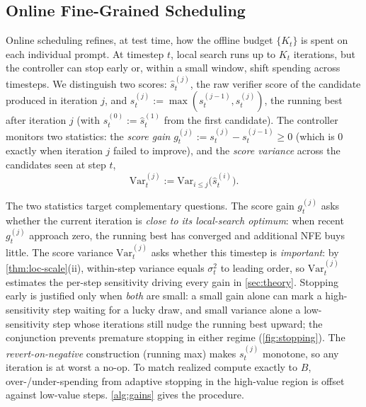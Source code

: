 \subsection{Online Fine-Grained Scheduling}
\label{sec:online}

Online scheduling refines, at test time, how the offline budget $\{K_t\}$ is spent on each individual prompt. At timestep $t$, local search runs up to $K_t$ iterations, but the controller can stop early or, within a small window, shift spending across timesteps. We distinguish two scores: $\hat s_t^{(j)}$, the raw verifier score of the candidate produced in iteration $j$, and $s_t^{(j)} := \max(s_t^{(j-1)}, \hat s_t^{(j)})$, the running best after iteration $j$ (with $s_t^{(0)} := \hat s_t^{(1)}$ from the first candidate). The controller monitors two statistics: the \emph{score gain} $g_t^{(j)} := s_t^{(j)} - s_t^{(j-1)} \ge 0$ (which is $0$ exactly when iteration $j$ failed to improve), and the \emph{score variance} across the candidates seen at step $t$,
\begin{equation}
  \mathrm{Var}_t^{(j)} := \mathrm{Var}_{i \le j}\bigl(\hat s_t^{(i)}\bigr).
\end{equation}

The two statistics target complementary questions. The score gain $g_t^{(j)}$ asks whether the current iteration is \emph{close to its local-search optimum}: when recent $g_t^{(j)}$ approach zero, the running best has converged and additional NFE buys little. The score variance $\mathrm{Var}_t^{(j)}$ asks whether this timestep is \emph{important}: by \cref{thm:loc-scale}(ii), within-step variance equals $\sigma_t^2$ to leading order, so $\mathrm{Var}_t^{(j)}$ estimates the per-step sensitivity driving every gain in \cref{sec:theory}. Stopping early is justified only when \emph{both} are small: a small gain alone can mark a high-sensitivity step waiting for a lucky draw, and small variance alone a low-sensitivity step whose iterations still nudge the running best upward; the conjunction prevents premature stopping in either regime (\cref{fig:stopping}). The \emph{revert-on-negative} construction (running max) makes $s_t^{(j)}$ monotone, so any iteration is at worst a no-op. To match realized compute exactly to $B$, over-/under-spending from adaptive stopping in the high-value region is offset against low-value steps. \cref{alg:gains} gives the procedure.


